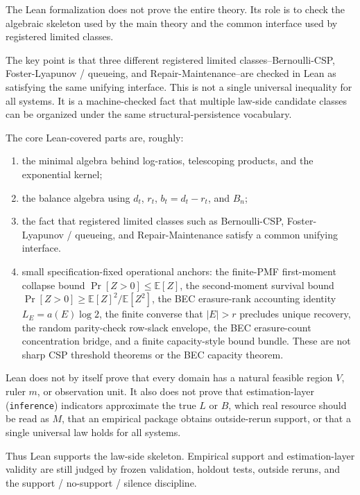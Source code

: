 \documentclass[12pt,a4paper]{article}
\begin{document}
The Lean formalization does not prove the entire theory. Its role is to check the algebraic skeleton used by the main theory and the common interface used by registered limited classes.

The key point is that three different registered limited classes--Bernoulli-CSP, Foster-Lyapunov / queueing, and Repair-Maintenance--are checked in Lean as satisfying the same unifying interface. This is not a single universal inequality for all systems. It is a machine-checked fact that multiple law-side candidate classes can be organized under the same structural-persistence vocabulary.

The core Lean-covered parts are, roughly:

\begin{enumerate}
\def\labelenumi{\arabic{enumi}.}
\tightlist
\item
  the minimal algebra behind log-ratios, telescoping products, and the exponential kernel;
\item
  the balance algebra using \(d_{t}\), \(r_{t}\), \(b_{t}=d_{t}-r_{t}\), and \(B_{n}\);
\item
  the fact that registered limited classes such as Bernoulli-CSP, Foster-Lyapunov / queueing, and Repair-Maintenance satisfy a common unifying interface.
\item
  small specification-fixed operational anchors: the finite-PMF first-moment collapse bound \(\Pr[Z>0]\le\mathbb E[Z]\), the second-moment survival bound \(\Pr[Z>0]\ge\mathbb E[Z]^2/\mathbb E[Z^2]\), the BEC erasure-rank accounting identity \(L_{E}=a(E)\log 2\), the finite converse that \(|E|>r\) precludes unique recovery, the random parity-check row-slack envelope, the BEC erasure-count concentration bridge, and a finite capacity-style bound bundle. These are not sharp CSP threshold theorems or the BEC capacity theorem.
\end{enumerate}

Lean does not by itself prove that every domain has a natural feasible region \(V\), ruler \(m\), or observation unit. It also does not prove that estimation-layer (\texttt{inference}) indicators approximate the true \(L\) or \(B\), which real resource should be read as \(M\), that an empirical package obtains outside-rerun support, or that a single universal law holds for all systems.

Thus Lean supports the law-side skeleton. Empirical support and estimation-layer validity are still judged by frozen validation, holdout tests, outside reruns, and the support / no-support / silence discipline.
\end{document}
